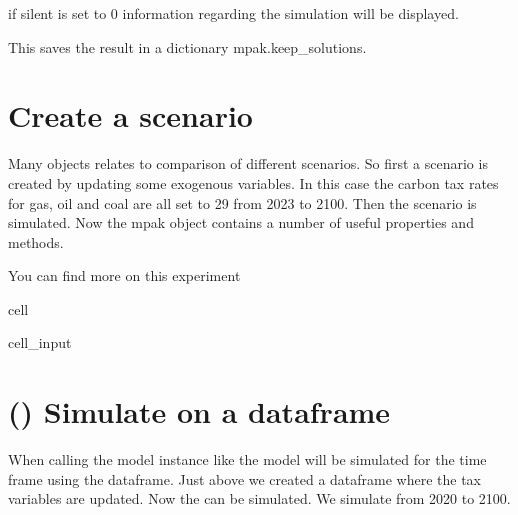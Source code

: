 \documentclass[letterpaper,10pt,english]{jupyterBook}
\begin{document}
\sphinxAtStartPar
{} if silent is set to 0  information regarding the simulation will be displayed.

\sphinxAtStartPar
{} This saves the result in a dictionary mpak.keep\_solutions.


\section{Create a scenario}
\label{\detokenize{content/notebooks/modelflow_features:create-a-scenario}}
\sphinxAtStartPar
Many objects relates to comparison of different scenarios. So first a scenario is created by updating some exogenous variables.
In this case the carbon tax rates for gas, oil and coal are all set to 29 from 2023 to 2100. Then the scenario is simulated.
Now the mpak object contains a number of useful properties and methods.

\sphinxAtStartPar
You can find more on this experiment 

\begin{sphinxuseclass}{cell}\begin{sphinxVerbatimInput}

\begin{sphinxuseclass}{cell_input}
\begin{sphinxVerbatim}[commandchars=\\\{\}]
    
\end{sphinxVerbatim}

\end{sphinxuseclass}\end{sphinxVerbatimInput}

\end{sphinxuseclass}

\section{() Simulate on a dataframe}
\label{\detokenize{content/notebooks/modelflow_features:simulate-on-a-dataframe}}
\sphinxAtStartPar
When calling the model instance like  the model will be simulated for the time frame  using the dataframe.  
Just above we created a dataframe  where the tax variables are updated. Now the  can be simulated. We simulate from 2020 to 2100.
\end{document}
